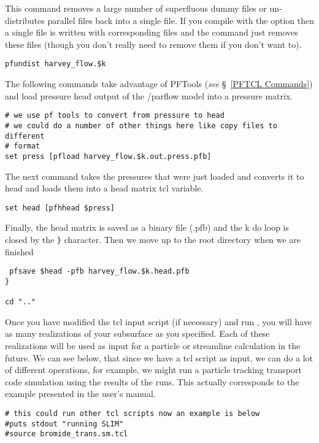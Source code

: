 This command removes a large number of superfluous dummy files or un-distributes parallel files back into a single file. If you
compile with the  option then a single \parflow{} file is written with corresponding  files and the 
 command just removes these  files (though you don't really need to remove them if you don't want to).

\begin{verbatim}
pfundist harvey_flow.$k
\end{verbatim}

The following commands take advantage of PFTools (\emph{see} \S~\ref{PFTCL Commands}) and load pressure head output of the
/parflow{} model into a pressure matrix.

\begin{verbatim}
# we use pf tools to convert from pressure to head
# we could do a number of other things here like copy files to different
# format
set press [pfload harvey_flow.$k.out.press.pfb]
\end{verbatim}

The next command takes the pressures that were just loaded and converts it to head and loads them into a head matrix tcl variable.

\begin{verbatim}
set head [pfhhead $press]
\end{verbatim}

Finally, the head matrix is saved as a \parflow{} binary file (.pfb) and the k do loop is closed by the \verb+}+ character.  
Then we move up to the root directory when we are finished

\begin{verbatim}
 pfsave $head -pfb harvey_flow.$k.head.pfb
}

cd ".."
\end{verbatim}

Once you have modified the tcl input script (if necessary) and run \parflow{}, you will have as
many realizations of your subsurface as you specified.  Each of these realizations will be used 
as input for a particle or streamline calculation in the future.  We can see below, that since 
we have a tcl script as input, we can do a lot of different operations, for example, we might 
run a particle tracking transport code simulation using the results of the \parflow{} runs.  
This actually corresponds to the example presented in the  user's manual.

\begin{verbatim}
# this could run other tcl scripts now an example is below
#puts stdout "running SLIM"
#source bromide_trans.sm.tcl
\end{verbatim}


